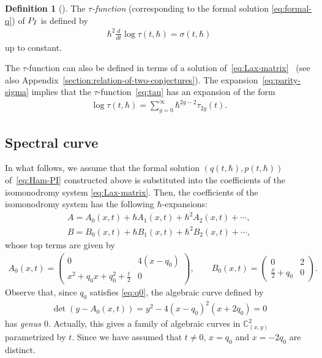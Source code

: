 \documentclass[11pt]{article}
\theoremstyle{definition}
\newtheorem{Def}[thm]{Definition}
\numberwithin{equation}{section}
\def\PI{P_{\rm I}}
\begin{document}
\begin{Def} [\cite{JMU, Okamoto}] \label{def:tau-function}
The {\em $\tau$-function}
(corresponding to the formal solution \eqref{eq:formal-q})
of $\PI$ is def\/ined by
\begin{gather} \label{eq:tau}
\hbar^{2} \frac{d}{dt} \log \tau(t,\hbar) = \sigma(t,\hbar)
\end{gather}
up to constant.
\end{Def}

The $\tau$-function can also be def\/ined in terms of
a solution of~\eqref{eq:Lax-matrix}~\cite{JMU} (see also
Appendix~\ref{section:relation-of-two-conjectures}).
The expansion~\eqref{eq:parity-sigma} implies that the $\tau$-function~\eqref{eq:tau} has an expansion of the form
\begin{gather*} %
\log \tau(t,\hbar) = \sum_{g=0}^{\infty} \hbar^{2g-2} \tau_{2g}(t).
\end{gather*} %

\subsection{Spectral curve}

In what follows, we assume that the formal solution
$(q(t,\hbar), p(t,\hbar))$ of~\eqref{eq:Ham-PI}
constructed above is substituted into the coef\/f\/icients
of the isomonodromy system \eqref{eq:Lax-matrix}.
Then, the coef\/f\/icients of the isomonodromy system has the following
$\hbar$-expansions:
\begin{gather*}
A   =   A_{0}(x,t) + \hbar A_{1}(x,t) + \hbar^{2} A_{2}(x,t) + \cdots, \\
B   =   B_{0}(x,t) + \hbar B_{1}(x,t) + \hbar^{2} B_{2}(x,t) + \cdots,
\end{gather*}
whose top terms are given by
\begin{gather*}
A_{0}(x,t)   =
\begin{pmatrix}
  0
&
 4(x-q_{0})
\\
\displaystyle x^{2} + q_{0} x + q_{0}^{2} + \frac{t}{2}
&
  0
\end{pmatrix}, \qquad
B_{0}(x,t)    =
\begin{pmatrix}
  0
&
  2
\\
\displaystyle \frac{x}{2}+q_{0}
&
   0
\end{pmatrix}.
\end{gather*}
Observe that, since $q_{0}$ satisf\/ies \eqref{eq:q0},
the algebraic curve def\/ined by
\begin{gather} \label{eq:sp-curve}
\det  (y - A_{0}(x,t)  ) =
y^{2} - 4  ( x-q_{0}  )^{2}  ( x+2q_{0}  )
= 0
\end{gather}
has {\em genus $0$}. Actually, this gives a family of algebraic
curves in ${\mathbb C}^{2}_{(x,y)}$
parametrized by $t$. Since we have assumed that
$t \ne 0$, $x=q_{0}$ and $x=-2q_{0}$ are distinct.
\end{document}
